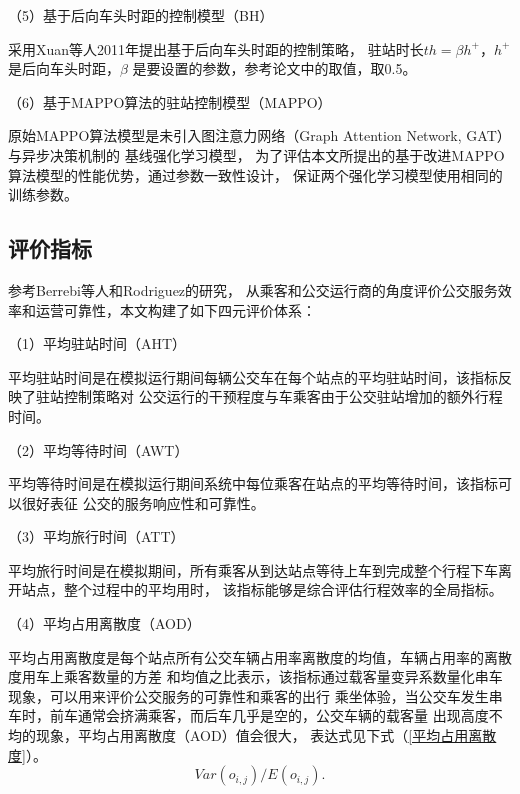 （5）基于后向车头时距的控制模型（BH）

采用Xuan等人\cite{xuan2011dynamic}2011年提出基于后向车头时距的控制策略，
驻站时长$th= \beta h^+$，$ h^+$是后向车头时距，$\beta$
是要设置的参数，参考论文中的取值，取0.5。

（6）基于MAPPO算法的驻站控制模型（MAPPO）

原始MAPPO算法模型是未引入图注意力网络（Graph Attention Network, GAT）与异步决策机制的
基线强化学习模型，
为了评估本文所提出的基于改进MAPPO算法模型的性能优势，通过参数一致性设计，
保证两个强化学习模型使用相同的训练参数。


\subsection{评价指标}

参考Berrebi等人\cite{berrebi2018comparing}和Rodriguez\cite{rodriguez2023cooperative}的研究，
从乘客和公交运行商的角度评价公交服务效率和运营可靠性，本文构建了如下四元评价体系：

（1）平均驻站时间（AHT）

平均驻站时间是在模拟运行期间每辆公交车在每个站点的平均驻站时间，该指标反映了驻站控制策略对
公交运行的干预程度与车乘客由于公交驻站增加的额外行程时间。

（2）平均等待时间（AWT）

平均等待时间是在模拟运行期间系统中每位乘客在站点的平均等待时间，该指标可以很好表征
公交的服务响应性和可靠性。

（3）平均旅行时间（ATT）

平均旅行时间是在模拟期间，所有乘客从到达站点等待上车到完成整个行程下车离开站点，整个过程中的平均用时，
该指标能够是综合评估行程效率的全局指标。

（4）平均占用离散度（AOD）

平均占用离散度是每个站点所有公交车辆占用率离散度的均值，车辆占用率的离散度用车上乘客数量的方差
和均值之比表示，该指标通过载客量变异系数量化串车现象，可以用来评价公交服务的可靠性和乘客的出行
乘坐体验，当公交车发生串车时，前车通常会挤满乘客，而后车几乎是空的，公交车辆的载客量
出现高度不均的现象，平均占用离散度（AOD）值会很大，
表达式见下式（\ref{平均占用离散度}）。
\begin{equation}\label{平均占用离散度}
    Var(o_{i,j}) / E(o_{i,j}).
\end{equation}


